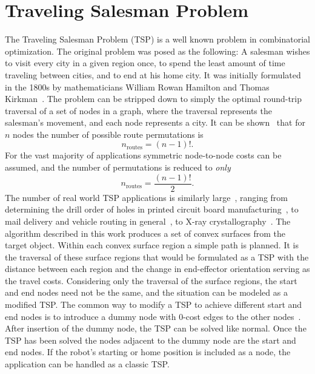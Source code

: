 \section{Traveling Salesman Problem}
The Traveling Salesman Problem (TSP) is a well known problem in combinatorial optimization.
The original problem was posed as the following:
A salesman wishes to visit every city in a given region once, to spend the least amount of time traveling between cities, and to end at his home city.
It was initially formulated in the 1800s by mathematicians William Rowan Hamilton and Thomas Kirkman~\cite{Graph_theory}.
The problem can be stripped down to simply the optimal round-trip traversal of a set of nodes in a graph, where the traversal represents the salesman's movement, and each node represents a city.
It can be shown~\cite{TSP_in_pursuit_of} that for $n$ nodes the number of possible route permutations is
\begin{equation*}
	n_{\text{routes}} = (n-1)!.
\end{equation*}
For the vast majority of applications symmetric node-to-node costs can be assumed, and the number of permutations is reduced to \textit{only}
\begin{equation*}
	n_{\text{routes}} = \frac{(n-1)!}{2}.
\end{equation*}
The number of real world TSP applications is similarly large~\cite{TSP_theory_applications}, ranging from determining the drill order of holes in printed circuit board manufacturing~\cite{TSP_PCB_manufacturing}, to mail delivery and vehicle routing in general~\cite{TSP_mail_delivery}, to X-ray crystallography~\cite{TSP_xray_crystallography}.
The algorithm described in this work produces a set of convex surfaces from the target object.
Within each convex surface region a simple path is planned.
It is the traversal of these surface regions that would be formulated as a TSP with the distance between each region and the change in end-effector orientation serving as the travel costs.
Considering only the traversal of the surface regions, the start and end nodes need not be the same, and the situation can be modeled as a modified TSP.
The common way to modify a TSP to achieve different start and end nodes is to introduce a dummy node with 0-cost edges to the other nodes~\cite{TSP_dummy_node_mod}.
After insertion of the dummy node, the TSP can be solved like normal.
Once the TSP has been solved the nodes adjacent to the dummy node are the start and end nodes.
If the robot's starting or home position is included as a node, the application can be handled as a classic TSP.

